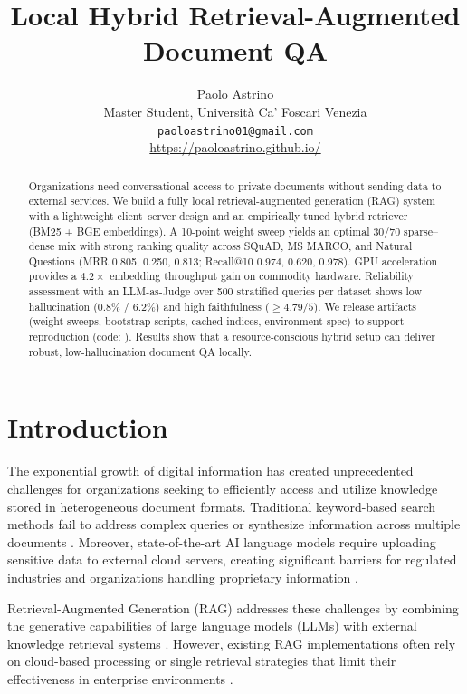 \documentclass[11pt]{article}
\title{Local Hybrid Retrieval-Augmented Document QA}
\author{Paolo Astrino \\
  Master Student, Università Ca' Foscari Venezia \\
  \texttt{paoloastrino01@gmail.com} \\
  \url{https://paoloastrino.github.io/}}
\begin{document}
\maketitle

\begin{abstract}
Organizations need conversational access to private documents without sending data to external services. We build a fully local retrieval-augmented generation (RAG) system with a lightweight client--server design and an empirically tuned hybrid retriever (BM25 + BGE embeddings). A 10-point weight sweep yields an optimal 30/70 sparse–dense mix with strong ranking quality across SQuAD, MS MARCO, and Natural Questions (MRR 0.805, 0.250, 0.813; Recall@10 0.974, 0.620, 0.978). GPU acceleration provides a $4.2\times$ embedding throughput gain on commodity hardware. Reliability assessment with an LLM-as-Judge over 500 stratified queries per dataset shows low hallucination (0.8\% / 6.2\%) and high faithfulness ($\ge 4.79/5$). We release artifacts (weight sweeps, bootstrap scripts, cached indices, environment spec) to support reproduction (code: \cite{localragrepo}). Results show that a resource-conscious hybrid setup can deliver robust, low-hallucination document QA locally.
\end{abstract}

\section{Introduction}

The exponential growth of digital information has created unprecedented challenges for organizations seeking to efficiently access and utilize knowledge stored in heterogeneous document formats. Traditional keyword-based search methods fail to address complex queries or synthesize information across multiple documents \cite{lewis2020rag}. Moreover, state-of-the-art AI language models require uploading sensitive data to external cloud servers, creating significant barriers for regulated industries and organizations handling proprietary information \cite{edpb,privacyinternational}.

Retrieval-Augmented Generation (RAG) addresses these challenges by combining the generative capabilities of large language models (LLMs) with external knowledge retrieval systems \cite{arxiv2410,arxiv24102}. However, existing RAG implementations often rely on cloud-based processing or single retrieval strategies that limit their effectiveness in enterprise environments \cite{hybridretrieval}.
\end{document}

